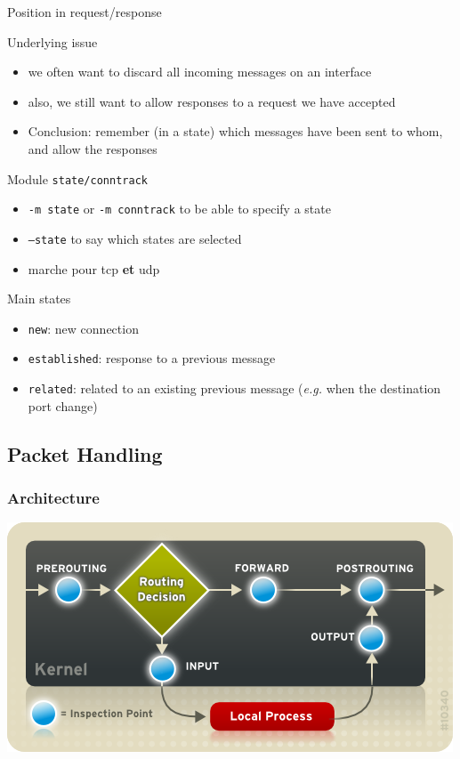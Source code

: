 \begin{reveals}
\begin{frame}[c]{Position in request/response}
  \begin{block}{Underlying issue}
    \begin{itemize}
    \item we often want to discard all incoming messages on an
      interface
    \item also, we still want to allow responses to a request we have accepted
    \item Conclusion: remember (in a state) which messages have been
      sent to whom, and allow the responses
    \end{itemize}
  \end{block}
  \vfill
  \begin{block}{Module \texttt{state/conntrack}}
    \begin{itemize}
    \item \texttt{-m state} or \texttt{-m conntrack} to be able to specify a state
    \item \texttt{--state} to say which states are selected
    \item marche pour tcp \textbf{et} udp
    \end{itemize}
  \end{block}
  \vfill
  \begin{block}{Main states}
    \begin{itemize}
    \item \texttt{new}: new connection
    \item \texttt{established}: response to a previous message
    \item \texttt{related}: related to an existing previous message
      (\emph{e.g.} when the destination port change)
    \end{itemize}
  \end{block}

\end{frame}

\subsection{Packet Handling}



\begin{frame}
  \frametitle{Architecture}

  \vfill
  \begin{center}
    \includegraphics[width=0.8\linewidth]{images/iptables_small}
  \end{center}
  \vfill
\end{frame}


\end{reveals}
